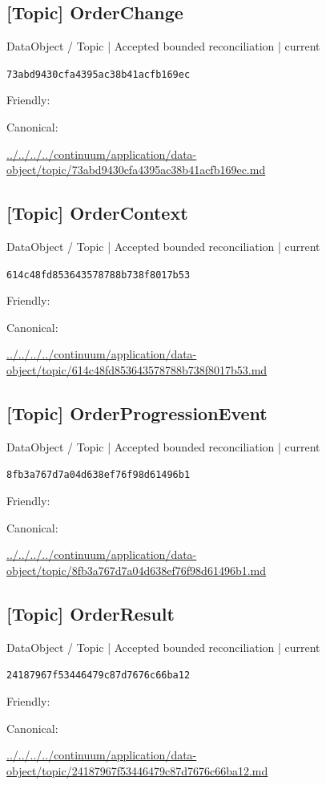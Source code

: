 \documentclass[10pt,a4paper]{article}
\begin{document}
\subsection*{[Topic] OrderChange}
{\small DataObject / Topic | Accepted bounded reconciliation | current}\par
\texttt{73abd9430cfa4395ac38b41acfb169ec}\par
Friendly: \par
Canonical: \par
{\footnotesize\url{../../../../continuum/application/data-object/topic/73abd9430cfa4395ac38b41acfb169ec.md}}\par
\subsection*{[Topic] OrderContext}
{\small DataObject / Topic | Accepted bounded reconciliation | current}\par
\texttt{614c48fd853643578788b738f8017b53}\par
Friendly: \par
Canonical: \par
{\footnotesize\url{../../../../continuum/application/data-object/topic/614c48fd853643578788b738f8017b53.md}}\par
\subsection*{[Topic] OrderProgressionEvent}
{\small DataObject / Topic | Accepted bounded reconciliation | current}\par
\texttt{8fb3a767d7a04d638ef76f98d61496b1}\par
Friendly: \par
Canonical: \par
{\footnotesize\url{../../../../continuum/application/data-object/topic/8fb3a767d7a04d638ef76f98d61496b1.md}}\par
\subsection*{[Topic] OrderResult}
{\small DataObject / Topic | Accepted bounded reconciliation | current}\par
\texttt{24187967f53446479c87d7676c66ba12}\par
Friendly: \par
Canonical: \par
{\footnotesize\url{../../../../continuum/application/data-object/topic/24187967f53446479c87d7676c66ba12.md}}\par
\end{document}
